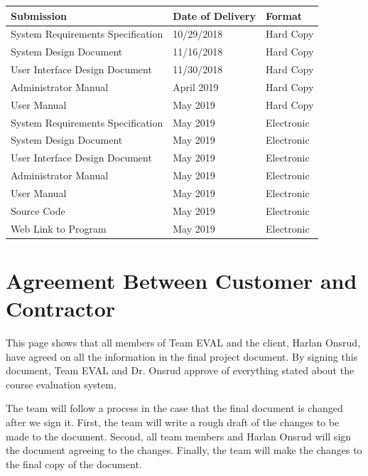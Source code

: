 \documentclass{article}
\begin{document}
\begin{center}
\begin{tabular}{|p{6cm}|p{3cm}|p{3cm}|} 
\hline
\textbf{Submission} & \textbf{Date of Delivery} & \textbf{Format} \\
\hline
System Requirements Specification & 10/29/2018 & Hard Copy\\ 
\hline
System Design Document & 11/16/2018 & Hard Copy\\ 
\hline
User Interface Design Document & 11/30/2018 & Hard Copy\\ 
\hline
Administrator Manual & April 2019 & Hard Copy\\ 
\hline
User Manual & May 2019 & Hard Copy\\ 
\hline
System Requirements Specification & May 2019 & Electronic\\ 
\hline
System Design Document & May 2019 & Electronic\\ 
\hline
User Interface Design Document & May 2019 & Electronic\\ 
\hline
Administrator Manual & May 2019 & Electronic\\ 
\hline
User Manual & May 2019 & Electronic\\ 
\hline
Source Code & May 2019 & Electronic\\ 
\hline
Web Link to Program & May 2019 & Electronic\\ 
\hline
\end{tabular}
\end{center}


\newpage
\section{Agreement Between Customer and Contractor}

This page shows that all members of Team EVAL and the client, Harlan Onsrud, have agreed on all the information in the final project document. By signing this document, Team EVAL and Dr. Onsrud approve of everything stated about the course evaluation system.

The team will follow a process in the case that the final document is changed after we sign it. First, the team will write a rough draft of the changes to be made to the document. Second, all team members and Harlan Onsrud will sign the document agreeing to the changes. Finally, the team will make the changes to the final copy of the document.
\end{document}
